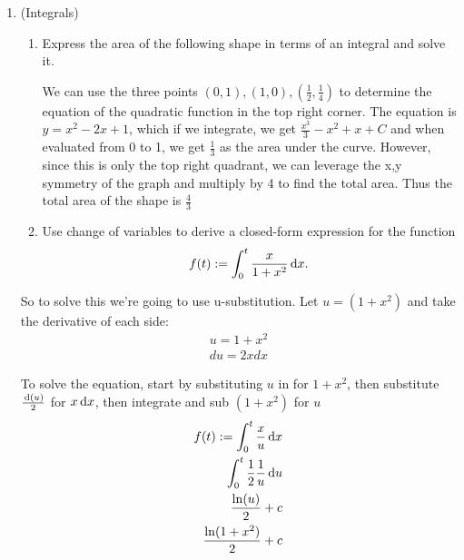 \documentclass[12pt,twoside]{article}
\begin{document}
\begin{enumerate}
  \break
  
 \item (Integrals) 
 \begin{enumerate}
 \item Express the area of the following shape in terms of an integral
   and solve it.
 \begin{center}
\end{center}
\par
We can use the three points $(0,1), (1,0),(\frac{1}{2},\frac{1}{4})$ to determine the equation of the quadratic function in the top right corner.
The equation is $y = x^2-2x+1$, which if we integrate, we get $\frac{x^3}{3}-x^2+x+C$ and when evaluated from 0 to 1, we get $\frac{1}{3}$ as the area under the curve. However, since this is only the top right quadrant, we can leverage the x,y symmetry of the graph and multiply by 4 to find the total area. Thus the total area of the shape is $\frac{4}{3}$
  \item Use change of variables to derive a closed-form expression for the function
 \begin{align}
f(t) := \int_{0}^{t} \frac{x}{1+x^2} \, \text{d}x.
 \end{align}
\end{enumerate}
\subitem
So to solve this we're going to use u-substitution. Let $u= (1+x^2)$ and take the derivative of each side:
\begin{equation}
\begin{split}
   u = 1+x^2 \\
   du = 2xdx
\end{split}
\end{equation}

To solve the equation, start by substituting $u$ in for $1+x^2$, then substitute $\frac{\, \text{d}(u)}{2}$ for $x\, \text{d}x$, then integrate and sub $(1+x^2)$ for $u$
\begin{equation} \begin{split}
    f(t) := \int_{0}^{t} \frac{x}{u} \, \text{d}x \\
    \int_{0}^{t} \frac{1}{2} \frac{1}{u} \, \text{d}u \\
    \frac{\ln(u)}{2} + c \\
    \frac{\ln(1+x^2)}{2}+c
\end{split}
\end{equation}

  
\end{enumerate}
\end{document}
